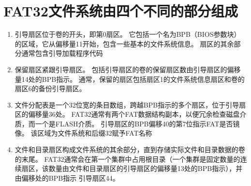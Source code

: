 \section{FAT32文件系统由四个不同的部分组成}
\begin{enumerate}
	\item 引导扇区位于卷的开头，即第0扇区。 它包括一个名为BPB（BIOS参数块）的区域，它从偏移量11开始，包含一些基本的文件系统信息。 扇区的其余部分通常包含引导加载程序代码
	\item 保留扇区紧跟引导扇区。 包括引导扇区的卷的保留扇区数由引导扇区的偏移量14处的BPB指示。 通常，保留的扇区包括扇区1的文件系统信息扇区和卷的扇区6的备份引导扇区。
	\item 文件分配表是一个32位宽的条目数组，跨越BPB指示的多个扇区，位于引导扇区的偏移量36处。 FAT32通常有两个FAT数据结构副本，以便冗余检查磁盘介质，而一个是FLASH介质。 引导扇区的BPB偏移40的第7位指示FAT是否镜像。 该区域为文件系统和后缀32赋予FAT名称
	\item 文件和目录扇区构成文件系统的其余部分，直到存储实际文件和目录数据的卷的末尾。 FAT32通常会在第一个集群中占用根目录（一个集群是固定数量的连续扇区，该数量由文件和目录扇区的引导扇区的偏移量13处的BPB指示），并由偏移处的BPB指示 引导扇区44。
\end{enumerate}